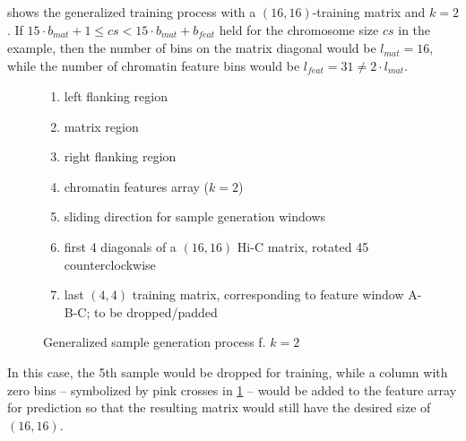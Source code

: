 shows the generalized training process with a $(16, 16)$-training matrix and $k=2$. 
If  $15\cdot b_\mathit{mat} + 1 \leq cs < 15\cdot b_\mathit{mat} + b_\mathit{feat}$ held for the chromosome size $cs$ in the example,
then the number of bins on the matrix diagonal would be $l_\mathit{mat}=16$, while the number of chromatin feature bins would be $l_\mathit{feat}=31 \not = 2 \cdot l_\mathit{mat}$.
\begin{figure}
 \begin{minipage}{0.65\textwidth}
    \caption{Generalized sample generation process f. $k=2$}
    \label{fig:methods:sample_gen_generalized}
 \end{minipage}\hfill
 \begin{minipage}{0.3\textwidth}
 \scriptsize
  \begin{enumerate}[label=\Alph*:,leftmargin=*]
   \raggedright
    \item left flanking region
    \item matrix region
    \item right flanking region
    \item chromatin features array ($k=2$)
    \item sliding direction for sample generation windows
    \item first 4 diagonals of a $(16, 16)$ Hi-C matrix, rotated \SI{45}{\deg} counterclockwise
    \item last $(4, 4)$ training matrix, corresponding to feature window A-B-C; to be dropped/padded
\end{enumerate}
 \end{minipage}
\end{figure}
In this case, the 5th sample would be dropped for training,
while a column with zero bins -- symbolized by pink crosses in \cref{fig:methods:sample_gen_generalized} -- would be added to the feature array for prediction
so that the resulting matrix would still have the desired size of $(16, 16)$.

